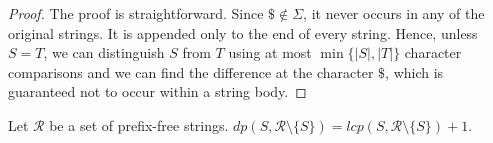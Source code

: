 \begin{proof}
    The proof is straightforward. Since $\texttt{\$} \not\in \Sigma$, it never occurs in any of the original strings. It is appended only to the end of every string. Hence, unless $S = T$, we can distinguish $S$ from $T$ using at most $\min\{|S|,|T|\}$ character comparisons and we can find the difference at the character $\texttt{\$}$, which is guaranteed not to occur within a string body.
\end{proof}

\begin{lemma}
    Let $\mathcal{R}$ be a set of prefix-free strings. $\textit{dp}(S,\mathcal{R}\setminus\{S\}) = \textit{lcp}(S,\mathcal{R}\setminus\{S\}) + 1$.
\end{lemma}